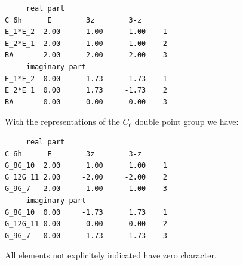 \documentclass[12pt,a4paper]{article}
\begin{document}
\begin{verbatim}
     real part
C_6h      E        3z        3-z
E_1*E_2  2.00     -1.00     -1.00    1
E_2*E_1  2.00     -1.00     -1.00    2
BA       2.00      2.00      2.00    3
     imaginary part
E_1*E_2  0.00     -1.73      1.73    1
E_2*E_1  0.00      1.73     -1.73    2
BA       0.00      0.00      0.00    3
\end{verbatim}
With the representations of the $C_6$ double point group we have:
\begin{verbatim}
     real part
C_6h      E        3z        3-z
G_8G_10  2.00      1.00      1.00    1
G_12G_11 2.00     -2.00     -2.00    2
G_9G_7   2.00      1.00      1.00    3
     imaginary part
G_8G_10  0.00     -1.73      1.73    1
G_12G_11 0.00      0.00      0.00    2
G_9G_7   0.00      1.73     -1.73    3
\end{verbatim}
All elements not explicitely indicated have zero character.

\newpage
\end{document}
